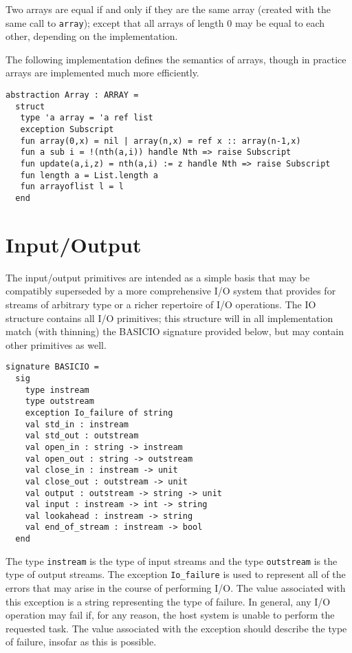 Two arrays are equal if and only if they are the same array (created
with the same call to \verb"array"); except that all arrays of length
0 may be equal to each other, depending on the implementation.

The following implementation defines the semantics of arrays, though
in practice arrays are implemented much more efficiently.
\begin{verbatim}
abstraction Array : ARRAY =
  struct
   type 'a array = 'a ref list
   exception Subscript
   fun array(0,x) = nil | array(n,x) = ref x :: array(n-1,x)
   fun a sub i = !(nth(a,i)) handle Nth => raise Subscript
   fun update(a,i,z) = nth(a,i) := z handle Nth => raise Subscript
   fun length a = List.length a
   fun arrayoflist l = l
  end
\end{verbatim}
\section{Input/Output}
The input/output primitives are intended as a simple basis that may
be compatibly superseded by a more comprehensive I/O system that
provides for streams of arbitrary type or a richer repertoire of I/O
operations.  The IO structure contains all I/O primitives; this
structure will in all implementation
match (with thinning) the BASICIO signature provided
below, but may contain other primitives as well.

\begin{verbatim}
signature BASICIO = 
  sig
    type instream 
    type outstream
    exception Io_failure of string
    val std_in : instream
    val std_out : outstream
    val open_in : string -> instream
    val open_out : string -> outstream
    val close_in : instream -> unit
    val close_out : outstream -> unit
    val output : outstream -> string -> unit
    val input : instream -> int -> string
    val lookahead : instream -> string
    val end_of_stream : instream -> bool
  end

\end{verbatim}
The type \verb"instream" is the type of input streams and the type
\verb"outstream" is the type of output streams.  The exception
\verb"Io_failure" is used to represent all of the errors that may
arise in the course of performing I/O.  The value associated with
this exception is a string representing the type of failure.  In
general, any I/O operation may fail if, for any reason, the host
system is unable to perform the requested task.  The value associated
with the exception should describe the type of failure, insofar as
this is possible.


